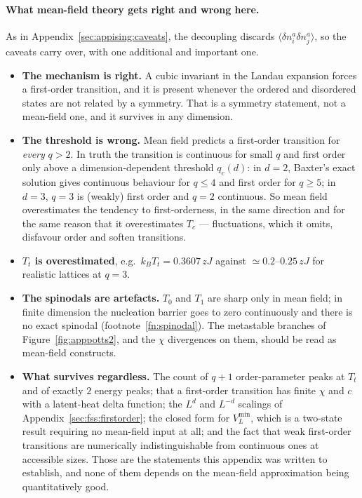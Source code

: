\documentclass[10pt,a4paper]{article}
\theoremstyle{remark}
\begin{document}
\paragraph{What mean-field theory gets right and wrong here.} As in
Appendix~\ref{sec:appising:caveats}, the decoupling discards
$\langle\delta n_i^a\delta n_j^a\rangle$, so the caveats carry over, with one
additional and important one.

\begin{itemize}
\item \textbf{The mechanism is right.} A cubic invariant in the Landau expansion
forces a first-order transition, and it is present whenever the ordered and
disordered states are not related by a symmetry. That is a symmetry statement, not
a mean-field one, and it survives in any dimension.
\item \textbf{The threshold is wrong.} Mean field predicts a first-order
transition for \emph{every} $q>2$. In truth the transition is continuous for
small $q$ and first order only above a dimension-dependent threshold $q_c(d)$: in
$d=2$, Baxter's exact solution gives continuous behaviour for $q\leq4$ and first
order for $q\geq5$; in $d=3$, $q=3$ is (weakly) first order and $q=2$ continuous.
So mean field overestimates the tendency to first-orderness, in the same
direction and for the same reason that it overestimates $T_c$ --- fluctuations,
which it omits, disfavour order and soften transitions.
\item \textbf{$T_t$ is overestimated}, e.g.\ $k_BT_t=0.3607\,zJ$ against
$\simeq0.2$--$0.25\,zJ$ for realistic lattices at $q=3$.
\item \textbf{The spinodals are artefacts.} $T_0$ and $T_1$ are sharp only in
mean field; in finite dimension the nucleation barrier goes to zero continuously
and there is no exact spinodal (footnote~\ref{fn:spinodal}). The metastable
branches of Figure~\ref{fig:apppotts2}, and the $\chi$ divergences on them, should
be read as mean-field constructs.
\item \textbf{What survives regardless.} The count of $q+1$ order-parameter peaks
at $T_t$ and of exactly $2$ energy peaks; that a first-order transition has finite
$\chi$ and $c$ with a latent-heat delta function; the $L^{d}$ and $L^{-d}$
scalings of Appendix~\ref{sec:fss:firstorder}; the closed form for $V_L^{\min}$,
which is a two-state result requiring no mean-field input at all; and the fact
that weak first-order transitions are numerically indistinguishable from
continuous ones at accessible sizes. Those are the statements this appendix was
written to establish, and none of them depends on the mean-field approximation
being quantitatively good.
\end{itemize}
\end{document}
